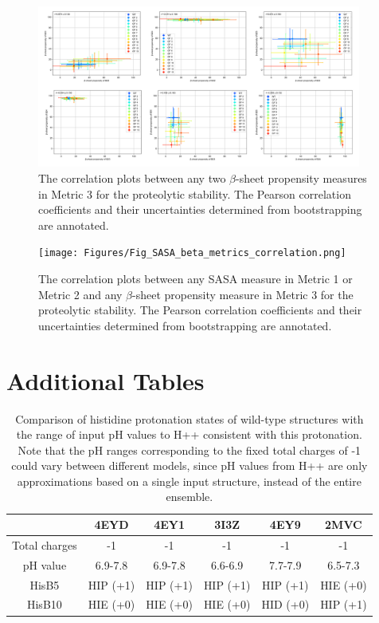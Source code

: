 \documentclass[9pt]{elife}
\begin{document}
\begin{figure}[H]
\centering
\includegraphics[width=0.95\textwidth]{Figures/Fig_beta_metrics_correlation.png}
\caption{The correlation plots between any two $\beta$-sheet propensity measures in Metric 3 for the proteolytic stability. The Pearson correlation coefficients and their uncertainties determined from bootstrapping are annotated.}
\label{corr_2}
\end{figure}

\begin{figure}[H]
\centering
\texttt{[image: Figures/Fig\_SASA\_beta\_metrics\_correlation.png]}
\caption{The correlation plots between any SASA measure in Metric 1 or Metric 2 and any $\beta$-sheet propensity measure in Metric 3 for the proteolytic stability. The Pearson correlation coefficients and their uncertainties determined from bootstrapping are annotated.}
\label{corr_3}
\end{figure}


\section{Additional Tables}

\renewcommand{\thetable}{S\arabic{table}}
\begin{table}[H]
\centering
\begin{tabular}{|c|c|c|c|c|c|}

\hline
     & 4EYD & 4EY1 & 3I3Z & 4EY9 & 2MVC \\
\hline
Total charges & -1 & -1 & -1 & -1 & -1 \\
\hline
pH value & 6.9-7.8 & 6.9-7.8 & 6.6-6.9 & 7.7-7.9 & 6.5-7.3 \\
\hline
HisB5 & HIP (+1) &HIP (+1) &HIP (+1) &HIP (+1) & HIE (+0) \\
\hline
HisB10 & HIE (+0) & HIE (+0) &HIE (+0) &HID (+0) & HIP (+1)  \\
\hline
\end{tabular}
\caption{Comparison of histidine protonation states of wild-type structures with the range of input pH values to H++ consistent with this protonation. Note that the pH ranges corresponding to the fixed total charges of -1 could vary between different models, since pH values from H++ are only approximations based on a single input structure, instead of the entire ensemble.}
\label{supple_tab: protonation}
\end{table}
\end{document}
